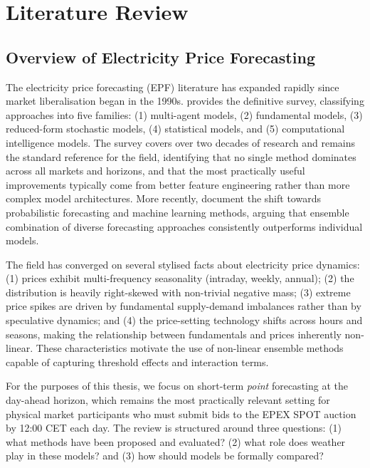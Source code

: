 \chapter{Literature Review}
\label{chap:lit}

\section{Overview of Electricity Price Forecasting}

The electricity price forecasting (EPF) literature has expanded rapidly since
market liberalisation began in the 1990s. \citet{weron2014} provides the
definitive survey, classifying approaches into five families: (1) multi-agent
models, (2) fundamental models, (3) reduced-form stochastic models,
(4) statistical models, and (5) computational intelligence models. The survey
covers over two decades of research and remains the standard reference for
the field, identifying that no single method dominates across all markets and
horizons, and that the most practically useful improvements typically come from
better feature engineering rather than more complex model architectures.
More recently, \citet{nowotarski2018} document the shift towards probabilistic
forecasting and machine learning methods, arguing that ensemble combination
of diverse forecasting approaches consistently outperforms individual models.

The field has converged on several stylised facts about electricity price
dynamics: (1) prices exhibit multi-frequency seasonality (intraday, weekly,
annual); (2) the distribution is heavily right-skewed with non-trivial negative
mass; (3) extreme price spikes are driven by fundamental supply-demand
imbalances rather than by speculative dynamics; and (4) the price-setting
technology shifts across hours and seasons, making the relationship between
fundamentals and prices inherently non-linear. These characteristics motivate
the use of non-linear ensemble methods capable of capturing threshold effects
and interaction terms.

For the purposes of this thesis, we focus on short-term \textit{point}
forecasting at the day-ahead horizon, which remains the most practically
relevant setting for physical market participants who must submit bids to the
EPEX SPOT auction by 12:00 CET each day. The review is structured around three
questions: (1) what methods have been proposed and evaluated? (2) what role
does weather play in these models? and (3) how should models be formally
compared?

